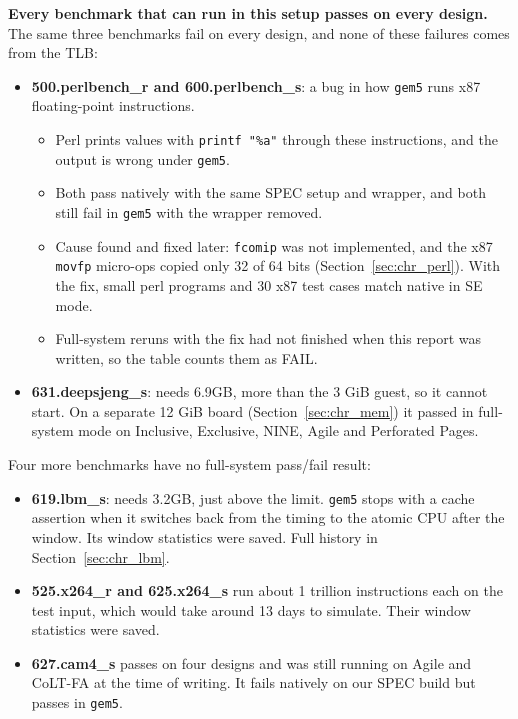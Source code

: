 \noindent \textbf{Every benchmark that can run in this setup passes on every design.} The same three benchmarks fail on every design, and none of these failures comes from the TLB:
\begin{itemize}
    \item \textbf{500.perlbench\_r and 600.perlbench\_s}: a bug in how \texttt{gem5} runs x87 floating-point instructions.
    \begin{itemize}
        \item Perl prints values with \texttt{printf "\%a"} through these instructions, and the output is wrong under \texttt{gem5}.
        \item Both pass natively with the same SPEC setup and wrapper, and both still fail in \texttt{gem5} with the wrapper removed.
        \item Cause found and fixed later: \texttt{fcomip} was not implemented, and the x87 \texttt{movfp} micro-ops copied only 32 of 64 bits (Section~\ref{sec:chr_perl}). With the fix, small perl programs and 30 x87 test cases match native in SE mode.
        \item Full-system reruns with the fix had not finished when this report was written, so the table counts them as FAIL.
    \end{itemize}
    \item \textbf{631.deepsjeng\_s}: needs 6.9GB, more than the 3 GiB guest, so it cannot start. On a separate 12 GiB board (Section~\ref{sec:chr_mem}) it passed in full-system mode on Inclusive, Exclusive, NINE, Agile and Perforated Pages.
\end{itemize}

\noindent Four more benchmarks have no full-system pass/fail result:
\begin{itemize}
    \item \textbf{619.lbm\_s}: needs 3.2GB, just above the limit. \texttt{gem5} stops with a cache assertion when it switches back from the timing to the atomic CPU after the window. Its window statistics were saved. Full history in Section~\ref{sec:chr_lbm}.
    \item \textbf{525.x264\_r and 625.x264\_s} run about 1 trillion instructions each on the test input, which would take around 13 days to simulate. Their window statistics were saved.
    \item \textbf{627.cam4\_s} passes on four designs and was still running on Agile and CoLT-FA at the time of writing. It fails natively on our SPEC build but passes in \texttt{gem5}.
\end{itemize}

